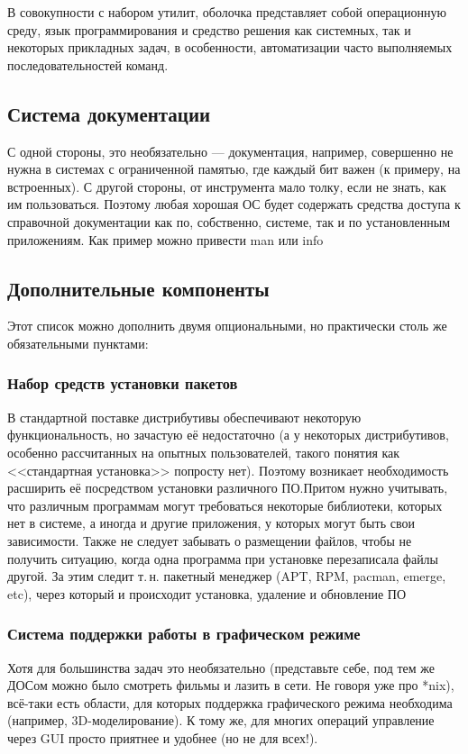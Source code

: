 В совокупности с набором утилит, оболочка представляет собой операционную среду, язык программирования и средство решения как системных, так и некоторых прикладных задач, в особенности, автоматизации часто выполняемых последовательностей команд.

\subsection{Система документации}\label{base:os:structure:docs}
С одной стороны, это необязательно --- документация, например, совершенно не нужна в системах с ограниченной памятью, где каждый бит важен (к примеру, на встроенных). С другой стороны, от инструмента мало толку, если не знать, как им пользоваться. Поэтому любая хорошая ОС будет содержать средства доступа к справочной документации как по, собственно, системе, так и по установленным приложениям. Как пример можно привести man или info

\subsection{Дополнительные компоненты}\label{base:os:structure:additional}
Этот список можно дополнить двумя опциональными, но практически столь же обязательными пунктами:

\subsubsection{Набор средств установки пакетов}\label{base:os:structure:additional:packagemanager}
В стандартной поставке дистрибутивы обеспечивают некоторую функциональность, но зачастую её недостаточно (а у некоторых дистрибутивов, особенно рассчитанных на опытных пользователей, такого понятия как <<стандартная установка>> попросту нет). Поэтому возникает необходимость расширить её посредством установки различного ПО.Притом нужно учитывать, что различным программам могут требоваться некоторые библиотеки, которых нет в системе, а иногда и другие приложения, у которых могут быть свои зависимости. Также не следует забывать о размещении файлов, чтобы не получить ситуацию, когда одна программа при установке перезаписала файлы другой. За этим следит т.\,н. пакетный менеджер (APT, RPM, pacman, emerge, etc), через который и происходит установка, удаление и обновление ПО

\subsubsection{Система поддержки работы в графическом режиме}\label{base:os:structure:additional:gui}
Хотя для большинства задач это необязательно (представьте себе, под тем же ДОСом можно было смотреть фильмы и лазить в сети. Не говоря уже про *nix), всё-таки есть области, для которых поддержка графического режима необходима (например, 3D-моделирование). К тому же, для многих операций управление через GUI просто приятнее и удобнее (но не для всех!).


